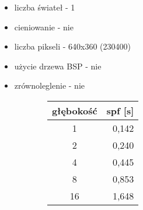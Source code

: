 \begin{itemize}

\item liczba świateł - 1
\item cieniowanie - nie
\item liczba pikseli - 640x360 (230400)
\item użycie drzewa BSP - nie
\item zrównoleglenie - nie

\end{itemize}

\begin{figure}[!htb]
\advance\leftskip-2cm
\begin{subfigure}{.5\textwidth}
\end{subfigure}
\hspace{2cm}
\begin{subfigure}{.5\textwidth}
		\begin{longtable}{|c|r|} \hline
	    głębokość & \multicolumn{1}{|c|}{spf [s]} \\ \hline
	    1 & 0,142 \\
		2 & 0,240 \\
		4 & 0,445 \\
		8 & 0,853 \\
		16 & 1,648 \\
		\hline
		\end{longtable}
\end{subfigure}
\end{figure}


